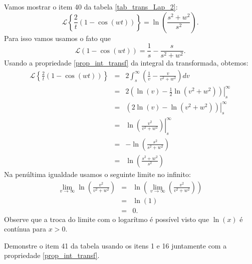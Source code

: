 \documentclass[Main.tex]{subfiles}
\begin{document}
\begin{ex}Vamos mostrar o item 40 da tabela \ref{tab_trans_Lap_2}:
$$
\mathcal{L}\left\{\frac{2}{t}\left(1-\cos(wt)\right)\right\}=\ln\left(\frac{s^2+w^2}{s^2}\right).
$$
Para isso vamos usamos o fato que
\begin{equation*}
\mathcal{L}\left(1-\cos(wt)\right)=\frac{1}{s}-\frac{s}{s^2+w^2}.
\end{equation*}
Usando a propriedade \ref{prop_int_transf} da integral da transformada, obtemos:
\begin{eqnarray*}
\mathcal{L}\left\{\frac{2}{t}\left(1-\cos(wt)\right)\right\}&=&2\int_s^\infty \left(\frac{1}{v}-\frac{v}{v^2+w^2}\right)dv\\
&=& \left.2\left(\ln(v)-\frac{1}{2}\ln(v^2+w^2)\right)\right|_s^\infty\\
&=& \left.\left(2\ln(v)-\ln(v^2+w^2)\right)\right|_s^\infty\\
&=&\left.\ln\left(\frac{v^2}{v^2+w^2}\right)\right|_s^\infty\\
&=&-\ln\left(\frac{s^2}{s^2+w^2}\right)\\
&=&\ln\left(\frac{s^2+w^2}{s^2}\right)
\end{eqnarray*}
Na penúltima igualdade usamos o seguinte limite no infinito:
\begin{eqnarray*}
\lim_{v\to\infty} \ln\left(\frac{v^2}{v^2+w^2}\right)&=& \ln\left(\lim_{v\to\infty}\left(\frac{v^2}{v^2+w^2}\right)\right)\\
&=& \ln\left(1\right)\\
&=&0.
\end{eqnarray*}
Observe que a troca do limite com o logarítmo é possível visto que $\ln(x)$ é contínua para $x>0$.
\end{ex}
\begin{prob}Demonstre o item 41 da tabela usando os itens 1 e 16 juntamente com a propriedade \ref{prop_int_transf}.
\end{prob}
\end{document}
